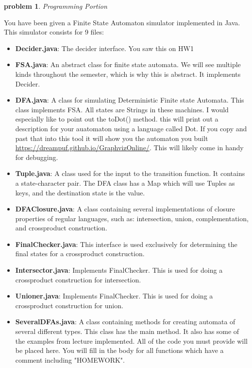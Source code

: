 \documentclass[10pt]{article}
\newtheorem{problem}{\sc\color{cit}problem}
\begin{document}
\begin{problem} Programming Portion \end{problem}

You have been given a Finite State Automaton simulator implemented in Java. This simulator consists for 9 files:
\begin{itemize}
    \item \textbf{Decider.java}: The decider interface. You saw this on HW1
    \item \textbf{FSA.java}: An abstract class for finite state automata. We will see multiple kinds throughout the semester, which is why this is abstract. It implements Decider.
    \item \textbf{DFA.java}: A class for simulating Deterministic Finite state Automata. This class implements FSA. All states are Strings in these machines. I would especially like to point out the toDot() method. this will print out a description for your auatomaton using a language called Dot. If you copy and past that into this tool it will show you the automaton you built \url{https://dreampuf.github.io/GraphvizOnline/}. This will likely come in handy for debugging.
    \item \textbf{Tuple.java}: A class used for the input to the transition function. It contains a state-character pair. The DFA class has a Map which will use Tuples as keys, and the destination state is the value.
    \item \textbf{DFAClosure.java}: A class containing several implementations of closure properties of regular languages, such as: intersection, union, complementation, and crossproduct construction.
    \item \textbf{FinalChecker.java}: This interface is used exclusively for determining the final states for a crossproduct construction.
    \item \textbf{Intersector.java}: Implements FinalChecker. This is used for doing a crossproduct construction for intersection.
    \item \textbf{Unioner.java}: Implements FinalChecker. This is used for doing a crossproduct construction for union.
    \item \textbf{SeveralDFAs.java}: A class containing methods for creating automata of several different types. This class has the main method. It also has some of the examples from lecture implemented. All of the code you must provide will be placed here. You will fill in the body for all functions which have a comment including "HOMEWORK".
\end{itemize}
\end{document}
